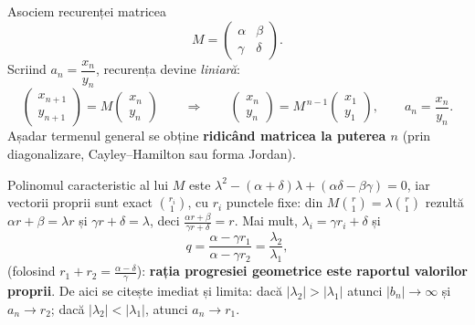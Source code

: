 \begin{teorema}
Asociem recurenței matricea
\[
M=\begin{pmatrix}\alpha & \beta\\ \gamma & \delta\end{pmatrix}.
\]
Scriind $a_n=\dfrac{x_n}{y_n}$, recurența devine \emph{liniară}:
\[
\begin{pmatrix}x_{n+1}\\ y_{n+1}\end{pmatrix}
=M\begin{pmatrix}x_n\\ y_n\end{pmatrix}
\qquad\Longrightarrow\qquad
\begin{pmatrix}x_n\\ y_n\end{pmatrix}=M^{\,n-1}\begin{pmatrix}x_1\\ y_1\end{pmatrix},\qquad a_n=\frac{x_n}{y_n}.
\]
Așadar termenul general se obține \textbf{ridicând matricea la puterea $n$} (prin diagonalizare, Cayley--Hamilton sau forma Jordan).
\end{teorema}

\begin{obs}
Polinomul caracteristic al lui $M$ este $\lambda^2-(\alpha+\delta)\lambda+(\alpha\delta-\beta\gamma)=0$, iar vectorii proprii sunt exact $\binom{r_i}{1}$, cu $r_i$ punctele fixe: din $M\binom{r}{1}=\lambda\binom{r}{1}$ rezultă $\alpha r+\beta=\lambda r$ și $\gamma r+\delta=\lambda$, deci $\frac{\alpha r+\beta}{\gamma r+\delta}=r$. Mai mult, $\lambda_i=\gamma r_i+\delta$ și
\[
q=\frac{\alpha-\gamma r_1}{\alpha-\gamma r_2}=\frac{\lambda_2}{\lambda_1},
\]
(folosind $r_1+r_2=\frac{\alpha-\delta}{\gamma}$): \textbf{rația progresiei geometrice este raportul valorilor proprii}. De aici se citește imediat și limita: dacă $|\lambda_2|>|\lambda_1|$ atunci $|b_n|\to\infty$ și $a_n\to r_2$; dacă $|\lambda_2|<|\lambda_1|$, atunci $a_n\to r_1$.
\end{obs}

